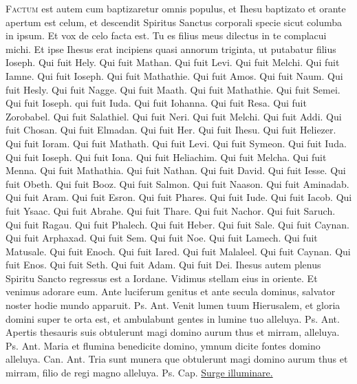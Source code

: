 \begin{multicols*}{2}
\lettrine[lines=2]{\zallmancaps \color{Red} F}{actum} est autem cum baptizaretur omnis populus, et Ihesu baptizato et orante apertum est celum, et descendit Spiritus Sanctus corporali specie sicut columba in ipsum. Et vox de celo facta est. Tu es filius meus dilectus in te complacui michi. Et ipse Ihesus erat incipiens quasi annorum triginta, ut putabatur filius Ioseph. Qui fuit Hely. Qui fuit Mathan. Qui fuit Levi. Qui fuit Melchi. Qui fuit Iamne. Qui fuit Ioseph. Qui fuit Mathathie. Qui fuit Amos. Qui fuit Naum. Qui fuit Hesly. Qui fuit Nagge. Qui fuit Maath. Qui fuit Mathathie. Qui fuit Semei. Qui fuit Ioseph. qui fuit Iuda. Qui fuit Iohanna. Qui fuit Resa. Qui fuit Zorobabel. Qui fuit Salathiel. Qui fuit Neri. Qui fuit Melchi. Qui fuit Addi. Qui fuit Chosan. Qui fuit Elmadan. Qui fuit Her. Qui fuit Ihesu. Qui fuit Heliezer. Qui fuit Ioram. Qui fuit Mathath. Qui fuit Levi. Qui fuit Symeon. Qui fuit Iuda. Qui fuit Ioseph. Qui fuit Iona. Qui fuit Heliachim. Qui fuit Melcha. Qui fuit Menna. Qui fuit Mathathia. Qui fuit Nathan. Qui fuit David. Qui fuit Iesse. Qui fuit Obeth. Qui fuit Booz. Qui fuit Salmon. Qui fuit Naason. Qui fuit Aminadab. Qui fuit Aram. Qui fuit Esron. Qui fuit Phares. Qui fuit Iude. Qui fuit Iacob. Qui fuit Ysaac. Qui fuit Abrahe. Qui fuit Thare. Qui fuit Nachor. Qui fuit Saruch. Qui fuit Ragau. Qui fuit Phalech. Qui fuit Heber. Qui fuit Sale. Qui fuit Caynan. Qui fuit Arphaxad. Qui fuit Sem. Qui fuit Noe. Qui fuit Lamech. Qui fuit Matusale. Qui fuit Enoch. Qui fuit Iared. Qui fuit Malaleel. Qui fuit Caynan. Qui fuit Enos. Qui fuit Seth. Qui fuit Adam. Qui fuit Dei. Ihesus autem plenus Spiritu Sancto regressus est a Iordane.
 \V Vidimus stellam eius in oriente. \R Et venimus adorare eum.
 Ante luciferum genitus et ante secula dominus, salvator noster hodie mundo apparuit. {\color{Red} Ps.}  {\color{Red} Ant.} Venit lumen tuum Hierusalem, et gloria domini super te orta est, et ambulabunt gentes in lumine tuo alleluya. {\color{Red} Ps.}  {\color{Red} Ant.} Apertis thesauris suis obtulerunt magi domino aurum thus et mirram, alleluya. {\color{Red} Ps.}  {\color{Red} Ant.} Maria et flumina benedicite domino, ymnum dicite fontes domino alleluya. {\color{Red} Can.}  {\color{Red} Ant.} Tria sunt munera que obtulerunt magi domino aurum thus et mirram, filio de regi magno alleluya. {\color{Red} Ps.}  {\color{Red} Cap.} \hyperlink{surge-capitulum}{Surge illuminare.}
\end{multicols*}
